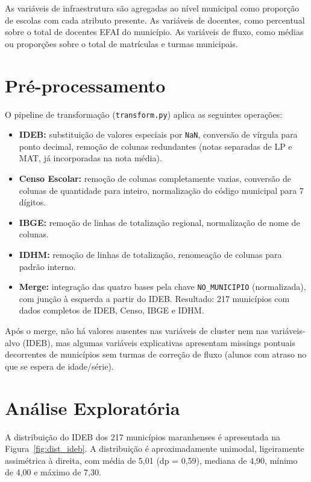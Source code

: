 As variáveis de infraestrutura são agregadas ao nível municipal como proporção de escolas com cada atributo presente. As variáveis de docentes, como percentual sobre o total de docentes EFAI do município. As variáveis de fluxo, como médias ou proporções sobre o total de matrículas e turmas municipais.

\section{Pré-processamento}

O pipeline de transformação (\texttt{transform.py}) aplica as seguintes operações:

\begin{itemize}
  \item \textbf{IDEB:} substituição de valores especiais por \texttt{NaN}, conversão de vírgula para ponto decimal, remoção de colunas redundantes (notas separadas de LP e MAT, já incorporadas na nota média).
  \item \textbf{Censo Escolar:} remoção de colunas completamente vazias, conversão de colunas de quantidade para inteiro, normalização do código municipal para 7 dígitos.
  \item \textbf{IBGE:} remoção de linhas de totalização regional, normalização de nome de colunas.
  \item \textbf{IDHM:} remoção de linhas de totalização, renomeação de colunas para padrão interno.
  \item \textbf{Merge:} integração das quatro bases pela chave \texttt{NO\_MUNICIPIO} (normalizada), com junção à esquerda a partir do IDEB. Resultado: 217 municípios com dados completos de IDEB, Censo, IBGE e IDHM.
\end{itemize}

Após o merge, não há valores ausentes nas variáveis de cluster nem nas variáveis-alvo (IDEB), mas algumas variáveis explicativas apresentam missings pontuais decorrentes de municípios sem turmas de correção de fluxo (alunos com atraso no que se espera de idade/série).

\section{Análise Exploratória}

A distribuição do IDEB dos 217 municípios maranhenses é apresentada na Figura~\ref{fig:dist_ideb}. A distribuição é aproximadamente unimodal, ligeiramente assimétrica à direita, com média de 5,01 (dp = 0,59), mediana de 4,90, mínimo de 4,00 e máximo de 7,30.

